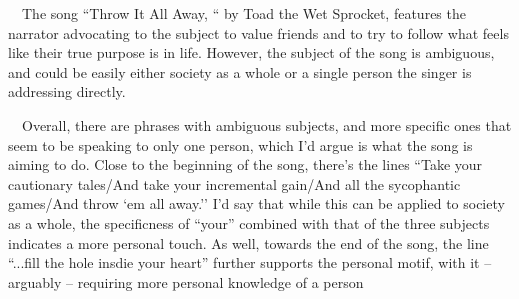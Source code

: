 \documentclass[letterpaper]{article}
\title{}
\author{}
\date{2016-04-13}
\begin{document}
\bigskip

\ \ The song ``Throw It All Away, `` by Toad the Wet Sprocket, features the narrator advocating to the subject to value
friends and to try to follow what feels like their true purpose is in life. However, the subject of the song is
ambiguous, and could be easily either society as a whole or a single person the singer is addressing directly.

\ \ Overall, there are phrases with ambiguous subjects, and more specific ones that seem to be speaking to only one
person, which I'd argue is what the song is aiming to do. Close to the beginning of the song, there's the lines ``Take
your cautionary tales/And take your incremental gain/And all the sycophantic games/And throw `em all away.'' I'd say
that while this can be applied to society as a whole, the specificness of ``your'' combined with that of the three
subjects indicates a more personal touch. As well, towards the end of the song, the line ``...fill the hole insdie your
heart'' further supports the personal motif, with it -- arguably -- requiring more personal knowledge of a person 
\end{document}
